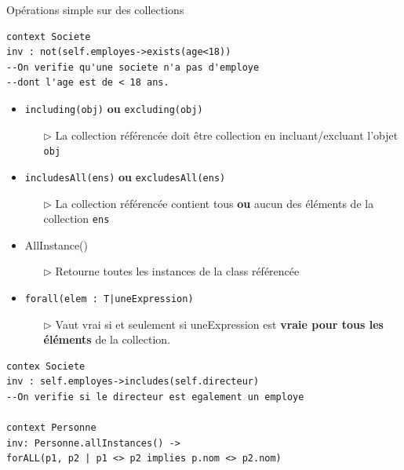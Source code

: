 \documentclass[16pt]{report}
\begin{document}
\begin{multicols*}{2}
\begin{EExample}{Opérations simple sur des collections}{}
\begin{lstlisting}
context Societe 
inv : not(self.employes->exists(age<18)) 
--On verifie qu'une societe n'a pas d'employe 
--dont l'age est de < 18 ans. 
           \end{lstlisting}
    \end{EExample}
        \begin{itemize}
            \item \textcolor{myb}{\texttt{including(obj)} \textbf{ou} \texttt{excluding(obj)}    }    
            \begin{itemize}
                \item[$\rhd$] La collection référencée doit être collection en incluant/excluant l'objet \texttt{obj}  
            \end{itemize}
            \item \textcolor{myb}{\texttt{includesAll(ens)} \textbf{ou} \texttt{excludesAll(ens)}      }  
            \begin{itemize}
                \item[$\rhd$] La collection référencée contient tous \textbf{ou} aucun des éléments de la 
                    collection \texttt{ens}  
            \end{itemize}
        \item \textcolor{myb}{AllInstance()}  
            \begin{itemize}
                \item[$\rhd$] Retourne toutes les instances de la class référencée 
            \end{itemize}
        \item \textcolor{myb}{\texttt{forall(elem : T|uneExpression)}}  
            \begin{itemize}
                \item[$\rhd$] Vaut vrai si et seulement si uneExpression est \textbf{vraie pour tous les éléments}
                    de la collection. 
            \end{itemize}
        \end{itemize}

\begin{lstlisting}
contex Societe 
inv : self.employes->includes(self.directeur)
--On verifie si le directeur est egalement un employe 

context Personne 
inv: Personne.allInstances() -> 
forALL(p1, p2 | p1 <> p2 implies p.nom <> p2.nom)

\end{lstlisting}
            


\end{multicols*}
\end{document}
